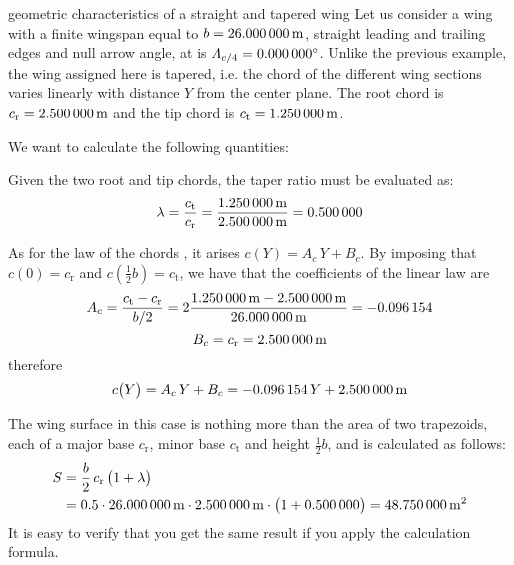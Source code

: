 \documentclass[[12pt,twoside]{book}
\begin{document}
%

%



\begin{myExampleX}{geometric characteristics of a straight and tapered wing}{}%
\label{example:Geometric:Characteristics:Of:A:Straight:And:Tapered:Wing}
%
\noindent
Let us consider a wing with a finite wingspan equal to $b=\SI[round-precision=1]{\mySpanWingMT}{\metre}$,
straight leading and trailing edges and
null arrow angle, at is $\Lambda_{c/4}=\SI[round-precision=0]{\myLambdaCQuarterDeg}{\degree}$.
Unlike the previous example, the wing assigned here is tapered, i.e.
the chord of the different wing sections varies linearly with distance $Y$ from the center plane.
The root chord is
%
$c_\mathrm{r}=\SI[round-precision=2]{\myChordRootWingMT}{\metre}$ and the tip chord is  
$c_\mathrm{t}=\SI[round-precision=2]{\myChordTipWingMT}{\metre}$.

We want to calculate the following quantities:

\noindent
{}%

\medskip
Given the two root and tip chords, the taper ratio must be evaluated as:
\[
\lambda
  =\frac{c_\mathrm{t}}{c_\mathrm{r}}
  =\frac{\SI[round-precision=2]{\myChordTipWingMT}{\metre}}{\SI[round-precision=2]{\myChordRootWingMT}{\metre}}
  = \SI[round-precision=2]{\myTaperRatioWing}{} 
\]

As for the law of the chords , it arises
$c ( Y ) = A_c \, Y + B_c$. By imposing that $c(0)=c_\mathrm{r}$ and $c(\frac{1}{2}b)=c_\mathrm{t}$,
we have that the coefficients of the linear law are
\[
A_c
  = \frac{c_\mathrm{t} - c_\mathrm{r}}{b/2}
  = 
    2 \frac{
      \SI[round-precision=2]{\myChordTipWingMT}{\metre} - \SI[round-precision=2]{\myChordRootWingMT}{\metre}
    }{
      \SI[round-precision=2]{\mySpanWingMT}{\metre}
    }
  =  \SI[round-precision=3]{\myCoefficientA}{} 
\]
\[
B_c
  = c_\mathrm{r}
  =  \SI[round-precision=2]{\myCoefficientB}{\metre} 
\]
therefore
\[
c \big( Y \big) = A_c \, Y + B_c
  = \SI[round-precision=3]{\myCoefficientA}{} \, Y
    + \SI[round-precision=2]{\myCoefficientB}{\metre}
\]

The wing surface in this case is nothing more than the area of two trapezoids,
each of a major base $c_\mathrm{r}$, minor base $c_\mathrm{t}$ and height $\frac{1}{2}b$,
and is calculated as follows:
\[
\begin{split}
S & {}= \frac{b}{2} \, c_\mathrm{r} \, \big( 1 + \lambda \big) \\
  & {}=
    \num{0.5} \cdot \SI[round-precision=1]{\mySpanWingMT}{\metre}
      \cdot \SI[round-precision=2]{\myChordRootWingMT}{\metre}
      \cdot \big( 1 + \SI[round-precision=2]{\myTaperRatioWing}{} \big) 
    =  \SI[round-precision=1]{\myAreaWingMTsquared}{\metre^2} 
\end{split}
\]
It is easy to verify that you get the same result if you apply the calculation formula.


\end{myExampleX}
\end{document}
